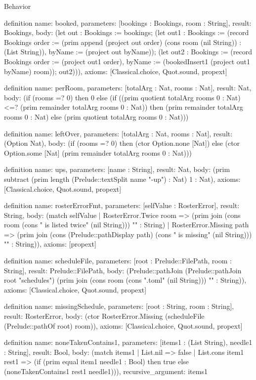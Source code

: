 \begin{lexlean}{Behavior}
\begin{semanticmodule}
definition{
  name: booked,
  parameters: [bookings : Bookings, room : String],
  result: Bookings,
  body: (let out : Bookings := bookings; (let out1 : Bookings := (record Bookings {order := (prim append (project out order) (cons room (nil String)) : (List String)), byName := (project out byName)}); (let out2 : Bookings := (record Bookings {order := (project out1 order), byName := (bookedInsert1 (project out1 byName) room)}); out2))),
  axioms: [Classical.choice, Quot.sound, propext]
}

definition{
  name: perRoom,
  parameters: [totalArg : Nat, rooms : Nat],
  result: Nat,
  body: (if (rooms =? 0) then 0 else (if ((prim quotient totalArg rooms 0 : Nat) <=? (prim remainder totalArg rooms 0 : Nat)) then (prim remainder totalArg rooms 0 : Nat) else (prim quotient totalArg rooms 0 : Nat)))
}

definition{
  name: leftOver,
  parameters: [totalArg : Nat, rooms : Nat],
  result: (Option Nat),
  body: (if (rooms =? 0) then (ctor Option.none [Nat]) else (ctor Option.some [Nat] (prim remainder totalArg rooms 0 : Nat)))
}

definition{
  name: ups,
  parameters: [name : String],
  result: Nat,
  body: (prim subtract (prim length (Prelude::textSplit name "-up") : Nat) 1 : Nat),
  axioms: [Classical.choice, Quot.sound, propext]
}

definition{
  name: rosterErrorFmt,
  parameters: [selfValue : RosterError],
  result: String,
  body: (match selfValue
    | RosterError.Twice room => (prim join (cons room (cons " is listed twice" (nil String))) "" : String)
    | RosterError.Missing path => (prim join (cons (Prelude::pathDisplay path) (cons " is missing" (nil String))) "" : String)),
  axioms: [propext]
}

definition{
  name: scheduleFile,
  parameters: [root : Prelude::FilePath, room : String],
  result: Prelude::FilePath,
  body: (Prelude::pathJoin (Prelude::pathJoin root "schedules") (prim join (cons room (cons ".toml" (nil String))) "" : String)),
  axioms: [Classical.choice, Quot.sound, propext]
}

definition{
  name: missingSchedule,
  parameters: [root : String, room : String],
  result: RosterError,
  body: (ctor RosterError.Missing (scheduleFile (Prelude::pathOf root) room)),
  axioms: [Classical.choice, Quot.sound, propext]
}

definition{
  name: noneTakenContains1,
  parameters: [items1 : (List String), needle1 : String],
  result: Bool,
  body: (match items1
    | List.nil => false
    | List.cons item1 rest1 => (if (prim equal item1 needle1 : Bool) then true else (noneTakenContains1 rest1 needle1))),
  recursive_argument: items1
}


\end{semanticmodule}
\end{lexlean}
